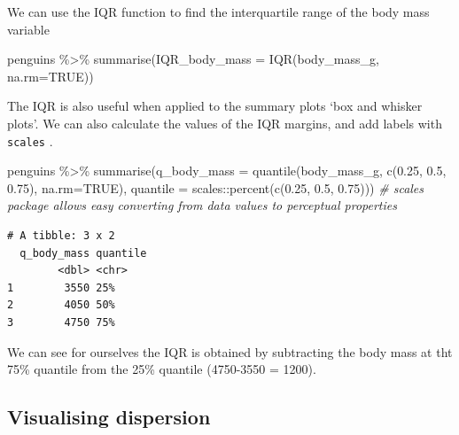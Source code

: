 \documentclass[
]{book}
\newenvironment{Shaded}{\begin{snugshade}}{\end{snugshade}}
\newcommand{\AttributeTok}[1]{\textcolor[rgb]{0.77,0.63,0.00}{#1}}
\newcommand{\CommentTok}[1]{\textcolor[rgb]{0.56,0.35,0.01}{\textit{#1}}}
\newcommand{\ConstantTok}[1]{\textcolor[rgb]{0.00,0.00,0.00}{#1}}
\newcommand{\FloatTok}[1]{\textcolor[rgb]{0.00,0.00,0.81}{#1}}
\newcommand{\FunctionTok}[1]{\textcolor[rgb]{0.00,0.00,0.00}{#1}}
\newcommand{\NormalTok}[1]{#1}
\newcommand{\SpecialCharTok}[1]{\textcolor[rgb]{0.00,0.00,0.00}{#1}}
\begin{document}
We can use the IQR function to find the interquartile range of the body mass variable

\begin{Shaded}
\begin{Highlighting}[]
\NormalTok{penguins }\SpecialCharTok{\%\textgreater{}\%} 
  \FunctionTok{summarise}\NormalTok{(}\AttributeTok{IQR\_body\_mass =} \FunctionTok{IQR}\NormalTok{(body\_mass\_g, }\AttributeTok{na.rm=}\ConstantTok{TRUE}\NormalTok{))}
\end{Highlighting}
\end{Shaded}

The IQR is also useful when applied to the summary plots `box and whisker plots'. We can also calculate the values of the IQR margins, and add labels with \texttt{scales} \citet{R-scales}.

\begin{Shaded}
\begin{Highlighting}[]
\NormalTok{penguins }\SpecialCharTok{\%\textgreater{}\%}
  \FunctionTok{summarise}\NormalTok{(}\AttributeTok{q\_body\_mass =} \FunctionTok{quantile}\NormalTok{(body\_mass\_g, }\FunctionTok{c}\NormalTok{(}\FloatTok{0.25}\NormalTok{, }\FloatTok{0.5}\NormalTok{, }\FloatTok{0.75}\NormalTok{), }\AttributeTok{na.rm=}\ConstantTok{TRUE}\NormalTok{),}
            \AttributeTok{quantile =}\NormalTok{ scales}\SpecialCharTok{::}\FunctionTok{percent}\NormalTok{(}\FunctionTok{c}\NormalTok{(}\FloatTok{0.25}\NormalTok{, }\FloatTok{0.5}\NormalTok{, }\FloatTok{0.75}\NormalTok{))) }\CommentTok{\# scales package allows easy converting from data values to perceptual properties}
\end{Highlighting}
\end{Shaded}

\begin{verbatim}
# A tibble: 3 x 2
  q_body_mass quantile
        <dbl> <chr>   
1        3550 25%     
2        4050 50%     
3        4750 75%    
\end{verbatim}

We can see for ourselves the IQR is obtained by subtracting the body mass at tht 75\% quantile from the 25\% quantile (4750-3550 = 1200).

\hypertarget{visualising-dispersion}{%
\subsection{Visualising dispersion}\label{visualising-dispersion}}
\end{document}

